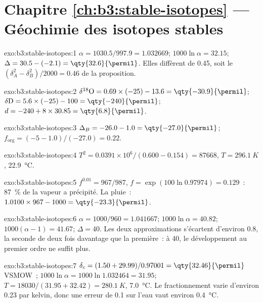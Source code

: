 \section*{Chapitre \ref{ch:b3:stable-isotopes} --- Géochimie des isotopes stables}

\begin{solution}{exo:b3:stable-isotopes:1}
$\alpha = 1030.5/997.9 = 1.032669$; $1000\ln\alpha = 32.15$; $\Delta = 30.5 -
(-2.1) = \qty{32.6}{\permil}$. Elles diffèrent de \qty{0.45}{\permil}, soit le
$(\delta_A^2 - \delta_B^2)/2000 = 0.46$ de la proposition.
\end{solution}

\begin{solution}{exo:b3:stable-isotopes:2}
$\delta^{18}\mathrm O = 0.69\times(-25) - 13.6 = \qty{-30.9}{\permil}$;
$\delta\mathrm D = 5.6\times(-25) - 100 = \qty{-240}{\permil}$; $d = -240 +
8\times30.85 = \qty{6.8}{\permil}$.
\end{solution}

\begin{solution}{exo:b3:stable-isotopes:3}
$\Delta_B = -26.0 - 1.0 = \qty{-27.0}{\permil}$; $f_{\mathrm{org}} = (-5 -
1.0)/(-27.0) = 0.22$.
\end{solution}

\begin{solution}{exo:b3:stable-isotopes:4}
$T^2 = 0.0391\times10^6/(0.600 - 0.154) = \num{87668}$, $T = \qty{296.1}{K}$,
\qty{22.9}{\celsius}.
\end{solution}

\begin{solution}{exo:b3:stable-isotopes:5}
$f^{0.01} = 967/987$, $f = \exp(100\ln0.97974) = 0.129$~: \qty{87}{\percent} de
la vapeur a précipité. La pluie~: $1.0100\times967 - 1000 =
\qty{-23.3}{\permil}$.
\end{solution}

\begin{solution}{exo:b3:stable-isotopes:6}
$\alpha = 1000/960 = 1.041667$; $1000\ln\alpha = 40.82$; $1000(\alpha - 1) =
41.67$; $\Delta = 40$. Les deux approximations s'écartent d'environ \qty{0.8}{\permil}, la
seconde de deux fois davantage que la première~: à \qty{40}{\permil}, le développement
au premier ordre ne suffit plus.
\end{solution}

\begin{solution}{exo:b3:stable-isotopes:7}
$\delta_c = (1.50 + 29.99)/0.97001 = \qty{32.46}{\permil}$ VSMOW~; $1000\ln\alpha
= 1000\ln1.032464 = 31.95$; $T = 18030/(31.95 + 32.42) = \qty{280.1}{K}$,
\qty{7.0}{\celsius}. Le fractionnement varie d'environ \qty{0.23}{\permil} par
kelvin, donc une erreur de \qty{0.1}{\permil} sur l'eau vaut environ \qty{0.4}{\celsius}.
\end{solution}

